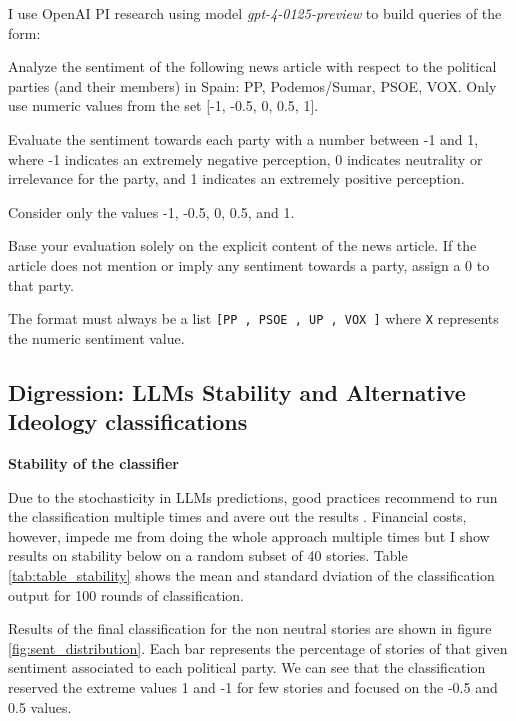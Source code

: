 \documentclass[12pt]{article}
\begin{document}
	
	
	I use OpenAI PI research  using model \textit{gpt-4-0125-preview} to build queries of the form: 
	
	
	\begin{tcolorbox}[colback=blue!5!white, colframe=blue!75!black, title=Prompt]
		Analyze the sentiment of the following news article with respect to the political parties (and their members) in Spain: PP, Podemos/Sumar, PSOE, VOX. Only use numeric values from the set [-1, -0.5, 0, 0.5, 1].
		
		Evaluate the sentiment towards each party with a number between -1 and 1, where -1 indicates an extremely negative perception, 0 indicates neutrality or irrelevance for the party, and 1 indicates an extremely positive perception.
		
		Consider only the values -1, -0.5, 0, 0.5, and 1.
		
		Base your evaluation solely on the explicit content of the news article. If the article does not mention or imply any sentiment towards a party, assign a 0 to that party.
		
		The format must always be a list \texttt{[PP
			, PSOE
			, UP
			, VOX
			]} where \texttt{X} represents the numeric sentiment value.
		
		
	\end{tcolorbox}
	
	
		\subsection{ Digression: LLMs Stability and Alternative Ideology classifications }
	\label{sec:sent_stability}
	
	
	\textbf{Stability of the classifier}
	
	Due to the stochasticity in LLMs predictions, good practices recommend to run the classification multiple times and avere out the results \citep{tornberg2023}. Financial costs, however, impede me from doing the whole approach multiple times but I show results on stability below on a random subset of  40 stories. Table \ref{tab:table_stability} shows the mean and standard dviation of the classification output for 100 rounds of classification. 
	
	Results of the final classification for the non neutral stories are shown in figure \ref{fig:sent_distribution}. Each bar represents the percentage of stories of that given sentiment associated to each political party. We can see that the classification reserved the extreme values 1 and -1 for few stories and focused on the -0.5 and 0.5 values. 
	
\end{document}
